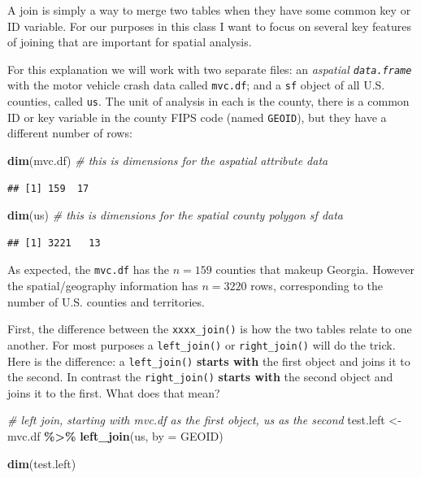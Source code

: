 \documentclass[
]{book}
\newenvironment{Shaded}{\begin{snugshade}}{\end{snugshade}}
\newcommand{\AttributeTok}[1]{\textcolor[rgb]{0.13,0.29,0.53}{#1}}
\newcommand{\CommentTok}[1]{\textcolor[rgb]{0.56,0.35,0.01}{\textit{#1}}}
\newcommand{\FunctionTok}[1]{\textcolor[rgb]{0.13,0.29,0.53}{\textbf{#1}}}
\newcommand{\NormalTok}[1]{#1}
\newcommand{\OtherTok}[1]{\textcolor[rgb]{0.56,0.35,0.01}{#1}}
\newcommand{\SpecialCharTok}[1]{\textcolor[rgb]{0.81,0.36,0.00}{\textbf{#1}}}
\newcommand{\StringTok}[1]{\textcolor[rgb]{0.31,0.60,0.02}{#1}}
\begin{document}
A join is simply a way to merge two tables when they have some common key or ID variable. For our purposes in this class I want to focus on several key features of joining that are important for spatial analysis.

For this explanation we will work with two separate files: an \emph{aspatial \texttt{data.frame}} with the motor vehicle crash data called \texttt{mvc.df}; and a \texttt{sf} object of all U.S. counties, called \texttt{us}. The unit of analysis in each is the county, there is a common ID or key variable in the county FIPS code (named \texttt{GEOID}), but they have a different number of rows:

\begin{Shaded}
\begin{Highlighting}[]
\FunctionTok{dim}\NormalTok{(mvc.df)  }\CommentTok{\# this is dimensions for the aspatial attribute data}
\end{Highlighting}
\end{Shaded}

\begin{verbatim}
## [1] 159  17
\end{verbatim}

\begin{Shaded}
\begin{Highlighting}[]
\FunctionTok{dim}\NormalTok{(us)      }\CommentTok{\# this is dimensions for the spatial county polygon sf data}
\end{Highlighting}
\end{Shaded}

\begin{verbatim}
## [1] 3221   13
\end{verbatim}

As expected, the \texttt{mvc.df} has the \(n=159\) counties that makeup Georgia. However the spatial/geography information has \(n=3220\) rows, corresponding to the number of U.S. counties and territories.

First, the difference between the \texttt{xxxx\_join()} is how the two tables relate to one another. For most purposes a \texttt{left\_join()} or \texttt{right\_join()} will do the trick. Here is the difference: a \texttt{left\_join()} \textbf{starts with} the first object and joins it to the second. In contrast the \texttt{right\_join()} \textbf{starts with} the second object and joins it to the first. What does that mean?

\begin{Shaded}
\begin{Highlighting}[]
\CommentTok{\# left join, starting with mvc.df as the first object, us as the second}
\NormalTok{test.left }\OtherTok{\textless{}{-}}\NormalTok{ mvc.df }\SpecialCharTok{\%\textgreater{}\%}
  \FunctionTok{left\_join}\NormalTok{(us, }\AttributeTok{by =} \StringTok{\textquotesingle{}GEOID\textquotesingle{}}\NormalTok{)}

\FunctionTok{dim}\NormalTok{(test.left)}
\end{Highlighting}
\end{Shaded}
\end{document}
